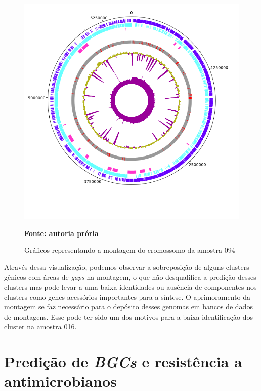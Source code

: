\begin{figure}[H]
	\caption{Gráficos representando a montagem do cromossomo da amostra 094}
	\label{fig:genoma94}
	\centering
	\includegraphics[width=0.8\linewidth]{imagens/genome/004.png} \\
	\centering
    \begin{small}\textbf{Fonte: autoria prória}\end{small}
\end{figure}
\vspace{\floatsep}


Através dessa visualização, podemos observar a sobreposição de alguns clusters gênicos com áreas
de \textit{gaps} na montagem, o que não desqualifica a predição desses clusters mas pode levar
a uma baixa identidades ou ausência de componentes nos clusters como genes acessórios importantes
para a síntese. O aprimoramento da montagem se faz necessário para o depósito desses genomas em 
bancos de dados de montagens. Esse pode ter sido um dos motivos para a baixa identificação dos
cluster na amostra 016.

\section{Predição de \textit{BGCs} e resistência a antimicrobianos}

